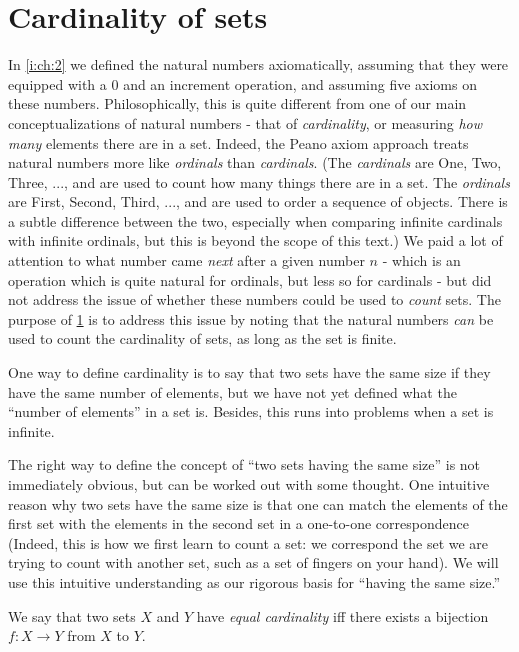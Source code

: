 \section{Cardinality of sets}\label{i:sec:3.6}

\begin{note}
  In \cref{i:ch:2} we defined the natural numbers axiomatically, assuming that they were equipped with a \(0\) and an increment operation, and assuming five axioms on these numbers.
  Philosophically, this is quite different from one of our main conceptualizations of natural numbers
  - that of \emph{cardinality}, or measuring \emph{how many} elements there are in a set.
  Indeed, the Peano axiom approach treats natural numbers more like \emph{ordinals} than \emph{cardinals}.
  (The \emph{cardinals} are One, Two, Three, ..., and are used to count how many things there are in a set.
  The \emph{ordinals} are First, Second, Third, ..., and are used to order a sequence of objects.
  There is a subtle difference between the two, especially when comparing infinite cardinals with infinite ordinals, but this is beyond the scope of this text.)
  We paid a lot of attention to what number came \emph{next} after a given number \(n\)
  - which is an operation which is quite natural for ordinals, but less so for cardinals
  - but did not address the issue of whether these numbers could be used to \emph{count} sets.
  The purpose of \cref{i:sec:3.6} is to address this issue by noting that the natural numbers \emph{can} be used to count the cardinality of sets, as long as the set is finite.

  One way to define cardinality is to say that two sets have the same size if they have the same number of elements, but we have not yet defined what the ``number of elements'' in a set is.
  Besides, this runs into problems when a set is infinite.

  The right way to define the concept of ``two sets having the same size'' is not immediately obvious, but can be worked out with some thought.
  One intuitive reason why two sets have the same size is that one can match the elements of the first set with the elements in the second set in a one-to-one correspondence
  (Indeed, this is how we first learn to count a set:
  we correspond the set we are trying to count with another set, such as a set of fingers on your hand).
  We will use this intuitive understanding as our rigorous basis for ``having the same size.''
\end{note}

\begin{defn}\label{i:3.6.1}
  We say that two sets \(X\) and \(Y\) have \emph{equal cardinality} iff there exists a bijection \(f : X \to Y\) from \(X\) to \(Y\).
\end{defn}

